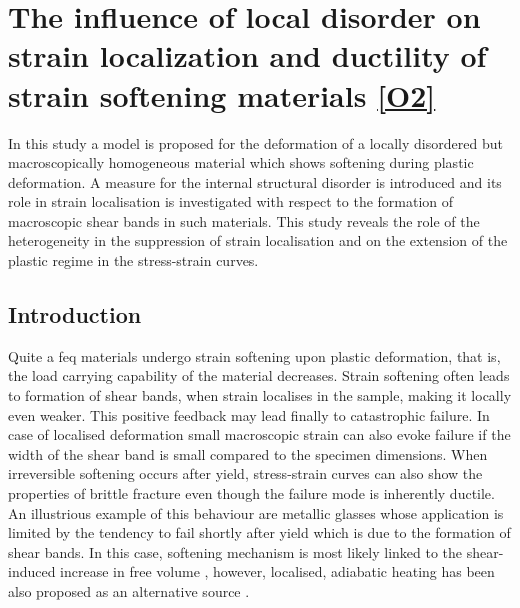 \chapter[The influence of disorder]{The influence of local disorder on
strain localization and ductility of strain softening materials \hyperref[paper:A3]{[O2]}} \label{chapter:disorder}

\ifpdf
    \graphicspath{{Chapter4/Figs/Raster/}{Chapter5/Figs/PDF/}{Chapter5/Figs/}}
\else
    \graphicspath{{Chapter5/Figs/Vector/}{Chapter5/Figs/}}
\fi

In this study a model is proposed for the deformation of a locally disordered but macroscopically homogeneous material which shows softening during plastic deformation. A measure for the internal structural disorder is introduced and its role in strain localisation is investigated with respect to the formation of macroscopic shear bands in such materials. This study reveals the role of the heterogeneity in the suppression of strain localisation and on the extension of the plastic regime in the stress-strain curves.

\section{Introduction} \label{sec:disorder_intro}

Quite a feq materials undergo strain softening upon plastic deformation, that is, the load carrying capability of the material decreases. Strain softening often leads to formation of shear bands, when strain localises in the sample, making it locally even weaker. This positive feedback may lead finally to catastrophic failure. In case of localised deformation small macroscopic strain can also evoke failure if the width of the shear band is small compared to the specimen dimensions. When irreversible softening occurs after yield, stress-strain curves can also show the properties of brittle fracture even though the failure mode is inherently ductile. An illustrious example of this behaviour are metallic glasses \cite{ASHBY2006321,schuh2007mechanical} whose application is limited by the tendency to fail shortly after yield which is due to the formation of shear bands. In this case, softening mechanism is most likely linked to the shear-induced increase in free volume \cite{steif1982strain}, however, localised, adiabatic heating has been also proposed as an alternative source \cite{wright2001localized}.

